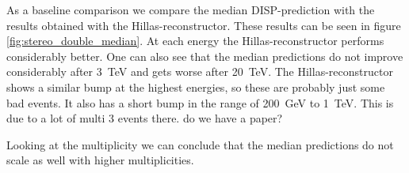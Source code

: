 As a baseline comparison we compare the median DISP-prediction 
with the results obtained with the Hillas-reconstructor.
These results can be seen in figure \ref{fig:stereo_double_median}.
At each energy the Hillas-reconstructor performs considerably better.
One can also see that the median predictions do not improve considerably after
\SI{3}{\tera\electronvolt} and gets worse after \SI{20}{\tera\electronvolt}.
The Hillas-reconstructor shows a similar bump at the highest energies,
so these are probably just some bad events.
It also has a short bump in the range of \SI{200}{\giga\electronvolt}
to \SI{1}{\tera\electronvolt}. This is due to a lot of multi 3 events there.
do we have a paper?

Looking at the multiplicity we can conclude that the median predictions
do not scale as well with higher multiplicities.

